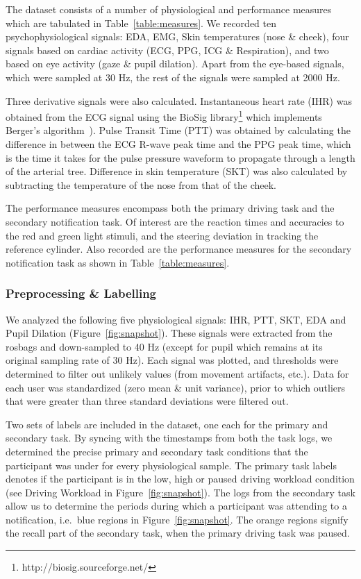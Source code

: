 The dataset consists of a number of physiological and performance measures which are tabulated in Table~\ref{table:measures}. We recorded ten psychophysiological signals: EDA, EMG, Skin temperatures (nose \& cheek), four signals based on cardiac activity (ECG, PPG, ICG \& Respiration), and two based on eye activity (gaze \& pupil dilation). Apart from the eye-based signals, which were sampled at 30 Hz, the rest of the signals were sampled at 2000 Hz. 

Three derivative signals were also calculated. Instantaneous heart rate (IHR) was obtained from the ECG signal using the BioSig library\footnote{http://biosig.sourceforge.net/} which implements Berger's algorithm~\cite{berger1986}). Pulse Transit Time (PTT) was obtained by calculating the difference in between the ECG R-wave peak time and the PPG peak time, which is the time it takes for the pulse pressure waveform to propagate through a length of the arterial tree. Difference in skin temperature (SKT) was also calculated by subtracting the temperature of the nose from that of the cheek.

The performance measures encompass both the primary driving task and the secondary notification task. Of interest are the reaction times and accuracies to the red and green light stimuli, and the steering deviation in tracking the reference cylinder. Also recorded are the performance measures for the secondary notification task as shown in Table~\ref{table:measures}.

\subsubsection{Preprocessing \& Labelling}
We analyzed the following five physiological signals: IHR, PTT, SKT, EDA and Pupil Dilation (Figure~\ref{fig:snapshot}). These signals were extracted from the rosbags and down-sampled to 40 Hz (except for pupil which remains at its original sampling rate of 30 Hz). Each signal was plotted, and thresholds were determined to filter out unlikely values (from movement artifacts, etc.). Data for each user was standardized (zero mean \& unit variance), prior to which outliers that were greater than three standard deviations were filtered out.

Two sets of labels are included in the dataset, one each for the primary and secondary task. By syncing with the timestamps from both the task logs, we determined the precise primary and secondary task conditions that the participant was under for every physiological sample. The primary task labels denotes if the participant is in the low, high or paused driving workload condition (see Driving Workload in Figure~\ref{fig:snapshot}). The logs from the secondary task allow us to determine the periods during which a participant was attending to a notification, i.e.\ blue regions in Figure~\ref{fig:snapshot}. The orange regions signify the recall part of the secondary task, when the primary driving task was paused.

